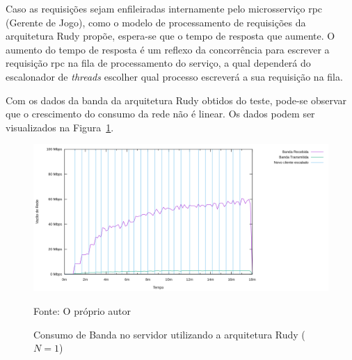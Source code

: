 Caso as requisições sejam enfileiradas internamente pelo microsserviço \ac{rpc} (Gerente de Jogo), como o modelo de processamento de requisições da arquitetura Rudy propõe, espera-se que o tempo de resposta que aumente.
%
O aumento do tempo de resposta é um reflexo da concorrência para escrever a requisição \ac{rpc} na fila de processamento do serviço, a qual dependerá do escalonador de \textit{threads} escolher qual processo escreverá a sua requisição na fila.

Com os dados da banda da arquitetura Rudy obtidos do teste, pode-se observar que o crescimento do consumo da rede não é linear.
%
Os dados podem ser visualizados na Figura~\ref{fig:rudy_t4_io}.

\begin{figure}[htb!]
    \caption{Consumo de Banda no servidor utilizando a arquitetura Rudy ($N=1$)}
    \label{fig:rudy_t4_io}
    \includegraphics[width=\textwidth]{metricas_rudy_t4/io.png}
    \centering
    
    Fonte: O próprio autor
\end{figure}

